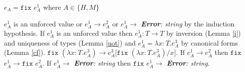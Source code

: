\begin{case}

$e_{A}=\mathtt{fix}$ $e_{A}^{1}$ where $A\in\lbrace H,M\rbrace$

$e_{A}^{1}$ is an unforced value or $e_{A}^{1}\rightarrow e_{A}^{2}$ or $e_{A}^{1}\rightarrow$ \emph{\textbf{Error}: string} by the induction hypothesis.  If $e_{A}^{1}$ is an unforced value then $e_{A}^{1}:T\rightarrow T$ by inversion (Lemma \ref{i}) and uniqueness of types (Lemma \ref{uot}) and $e_{A}^{1}=\lambda x:T.e_{A}^{3}$ by canonical forms (Lemma \ref{cf}).  $\mathtt{fix}$ $(\lambda x:T.e_{A}^{3})\rightarrow e_{A}^{3}[\mathtt{fix}$ $(\lambda x:T.e_{A}^{3})/x]$.  If $e_{A}^{1}\rightarrow e_{A}^{2}$ then $\mathtt{fix}$ $e_{A}^{1}\rightarrow\mathtt{fix}$ $e_{A}^{2}$.  If $e_{A}^{1}\rightarrow$ \emph{\textbf{Error}: string} then $\mathtt{fix}$ $e_{A}^{1}\rightarrow$ \emph{\textbf{Error}: string}.

\end{case}